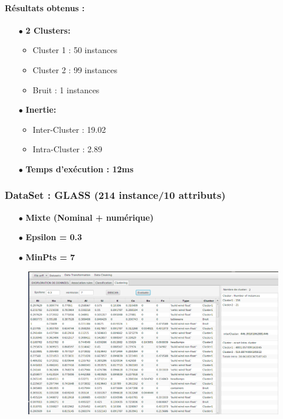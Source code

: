 \documentclass[12pt,a4paper,oneside]{book}
\begin{document}
\paragraph{Résultats obtenus :}
\begin{itemize}
	\item[$\bullet$] \textbf{2 Clusters: }
	\begin{itemize}
		\item Cluster 1 : 50 instances
		\item Cluster 2 : 99 instances
		\item Bruit : 1 instances
	\end{itemize}
	\item[$\bullet$] \textbf{Inertie:}
	\begin{itemize}
		\item Inter-Cluster : 19.02
		\item Intra-Cluster : 2.89
	\end{itemize}
	\item[$\bullet$] \textbf{Temps d'exécution : 12ms}
\end{itemize}

\subsubsection*{DataSet : GLASS (214 instance/10 attributs)}
\begin{itemize}
	\item[$\bullet$] \textbf{Mixte (Nominal + numérique)}
	\item[$\bullet$] \textbf{Epsilon = 0.3}
	\item[$\bullet$] \textbf{MinPts = 7}
\end{itemize}

\begin{figure}[H]
	\centering
	\includegraphics[scale=0.38]{images/dbscan3-2.png}
	\label{labelname}%
\end{figure}
\end{document}
